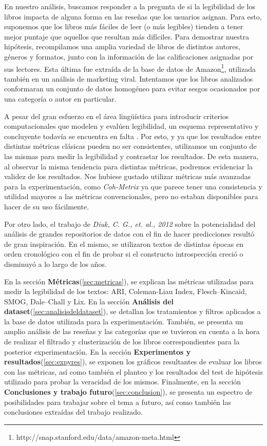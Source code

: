 \documentclass[12pt,journal,compsoc]{IEEEtran}
\begin{document}
En nuestro análisis, buscamos responder a la pregunta de si la legibilidad de los libros impacta de alguna forma en las reseñas que los usuarios asignan. Para esto, suponemos que los libros más fáciles de leer (o más legibles) tienden a tener mejor puntaje que aquellos que resultan más difíciles. Para demostrar nuestra hipótesis, recompilamos una amplia variedad de libros de distintos autores, géneros y formatos, junto con la información de las calificaciones asignadas por sus lectores. Esta última fue extraída de la base de datos de Amazon\footnote{http://snap.stanford.edu/data/amazon-meta.html}, utilizada también en un análisis de marketing viral\cite{leskovec}. Intentamos que los libros analizados conformaran un conjunto de datos homogéneo para evitar sesgos ocasionados por una categoría o autor en particular.

A pesar del gran esfuerzo en el área lingüística para introducir criterios computacionales que modelen y evalúen legibilidad, un esquema representativo y concluyente todavía se encuentra en falta \cite{orlow, klare, kanungo, karmakar}. Por esto, y ya que los resultados entre distintas métricas clásicas pueden no ser consistentes\cite{izgi}, utilizamos un conjunto de las mismas para medir la legibilidad y contrastar los resultados. De esta manera, al observar la misma tendencia para distintas métricas, podremos evidenciar la validez de los resultados. Nos hubiese gustado utilizar métricas más avanzadas para la experimentación, como \textit{Coh-Metrix}\cite{graesser} ya que parece tener una consistencia y utilidad mayores a las métricas convencionales\cite{crossley}, pero no estaban disponibles para hacer de su uso fácilmente.

Por otro lado, el trabajo de \textit{Diuk, C. G., et. al., 2012} \cite{diuk} sobre la potencialidad del análisis de grandes repositorios de datos con el fin de hacer predicciones resultó de gran inspiración. En el mismo, se utilizaron textos de distintas épocas en orden cronológico con el fin de probar si el constructo introspección creció o disminuyó a lo largo de los años. %

En la sección \textbf{Métricas}(\ref{sec:metricas}), se explican las métricas utilizadas para medir la legibilidad de los textos: ARI, Coleman-Liau Index, Flesch–Kincaid, SMOG, Dale–Chall y Lix. En la sección \textbf{Análisis del dataset}(\ref{sec:analisisdeldataset}), se detallan los tratamientos y filtros aplicados a la base de datos utilizada para la experimentación. También, se presenta un amplio análisis de las reseñas y las categorías que se tuvieron en cuenta a la hora de realizar el filtrado y clusterización de los libros correspondientes para la posterior experimentación. En la sección \textbf{Experimentos y resultados}(\ref{sec:expyres}), se exponen los gráficos resultantes de evaluar los libros con las métricas, así como también el planteo y los resultados del test de hipótesis utilizado para probar la veracidad de los mismos. Finalmente, en la sección \textbf{Conclusiones y trabajo futuro}(\ref{sec:conclusion}), se presenta un espectro de posibilidades para trabajar sobre el tema a futuro, así como también las conclusiones extraídas del trabajo realizado.
\end{document}
